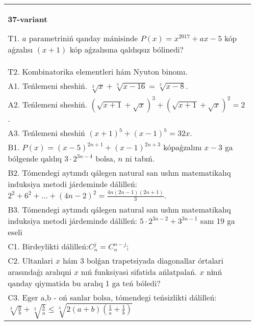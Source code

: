 \documentclass{article}
\begin{document}
\begin{tabular}{m{17cm}}
\textbf{37-variant}
\newline

T1. \(a\) parametriniń qanday mánisinde \(P(x) = x^{2017} + ax - 5\) kóp aǵzalısı \((x + 1)\) kóp aǵzalısına qaldıqsız bólinedi? \\
T2. Kombinatorika elementleri hám Nyuton binomı. \\
A1. Teńlemeni sheshiń. \(\sqrt[3]{x} + \sqrt[3]{x - 16} = \sqrt[3]{x - 8}\). \\
A2. Teńlemeni sheshiń. \((\sqrt{x + 1} + \sqrt{x})^{3} + (\sqrt{x + 1} + \sqrt{x})^{2} = 2\). \\
A3. Teńlemeni sheshiń \((x + 1)^{5} + (x - 1)^{5} = 32x\). \\
B1. \(P(x) = (x - 5)^{2n + 1} + (x - 1)^{2n + 3}\) kópaǵzalını \(x - 3\) ga bólgende qaldıq \(3 \cdot 2^{3n - 4}\) bolsa, \(n\) ni tabıń. \\
B2. Tómendegi aytımdı qálegen natural san ushın matematikalıq induksiya metodi járdeminde dálilleń: \(2^{2} + 6^{2} + \ldots + (4n - 2)^{2} = \frac{4n(2n - 1)(2n + 1)}{3}\). \\
B3. Tómendegi aytımdı qálegen natural san ushın matematikalıq induksiya metodi járdeminde dálilleń: \(5 \cdot 2^{3n - 2} + 3^{3n - 1}\) sanı 19 ga eseli \\
C1. Birdeylikti dálilleń:\(C_{n}^{j} = C_{n}^{n - j}\); \\
C2. Ultanlari \(x\) hám 3 bolǵan trapetsiyada diagonallar órtalari arasındaǵı aralıqni \(x\) nıń funksiyasi sifatida ańlatpalań. \(x\) nіnń qanday qiymatida bu aralıq 1 ga teń bóledi? \\
C3. Eger a,b - oń sanlar bolsa, tómendegi teńsizlikti dálilleń: \(\sqrt[3]{\frac{a}{b}} + \sqrt[3]{\frac{b}{a}} \leq \sqrt[3]{2(a + b)\left( \frac{1}{a} + \frac{1}{b} \right)}\) \\

\end{tabular}
\vspace{1cm}
\end{document}
